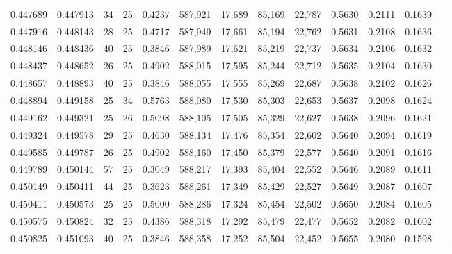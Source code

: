 \begin{tabular}{rrrrrrrrrrrrr}
0.447689 & 0.447913 &    34 &  25 &                                     0.4237 & 587,921 &  17,689 &  85,169 &  22,787 & 0.5630 & 0.2111 & 0.1639 \\
0.447916 & 0.448143 &    28 &  25 &                                     0.4717 & 587,949 &  17,661 &  85,194 &  22,762 & 0.5631 & 0.2108 & 0.1636 \\
0.448146 & 0.448436 &    40 &  25 &                                     0.3846 & 587,989 &  17,621 &  85,219 &  22,737 & 0.5634 & 0.2106 & 0.1632 \\
0.448437 & 0.448652 &    26 &  25 &                                     0.4902 & 588,015 &  17,595 &  85,244 &  22,712 & 0.5635 & 0.2104 & 0.1630 \\
0.448657 & 0.448893 &    40 &  25 &                                     0.3846 & 588,055 &  17,555 &  85,269 &  22,687 & 0.5638 & 0.2102 & 0.1626 \\
0.448894 & 0.449158 &    25 &  34 &                                     0.5763 & 588,080 &  17,530 &  85,303 &  22,653 & 0.5637 & 0.2098 & 0.1624 \\
0.449162 & 0.449321 &    25 &  26 &                                     0.5098 & 588,105 &  17,505 &  85,329 &  22,627 & 0.5638 & 0.2096 & 0.1621 \\
0.449324 & 0.449578 &    29 &  25 &                                     0.4630 & 588,134 &  17,476 &  85,354 &  22,602 & 0.5640 & 0.2094 & 0.1619 \\
0.449585 & 0.449787 &    26 &  25 &                                     0.4902 & 588,160 &  17,450 &  85,379 &  22,577 & 0.5640 & 0.2091 & 0.1616 \\
0.449789 & 0.450144 &    57 &  25 &                                     0.3049 & 588,217 &  17,393 &  85,404 &  22,552 & 0.5646 & 0.2089 & 0.1611 \\
0.450149 & 0.450411 &    44 &  25 &                                     0.3623 & 588,261 &  17,349 &  85,429 &  22,527 & 0.5649 & 0.2087 & 0.1607 \\
0.450411 & 0.450573 &    25 &  25 &                                     0.5000 & 588,286 &  17,324 &  85,454 &  22,502 & 0.5650 & 0.2084 & 0.1605 \\
0.450575 & 0.450824 &    32 &  25 &                                     0.4386 & 588,318 &  17,292 &  85,479 &  22,477 & 0.5652 & 0.2082 & 0.1602 \\
0.450825 & 0.451093 &    40 &  25 &                                     0.3846 & 588,358 &  17,252 &  85,504 &  22,452 & 0.5655 & 0.2080 & 0.1598 \\

\end{tabular}
